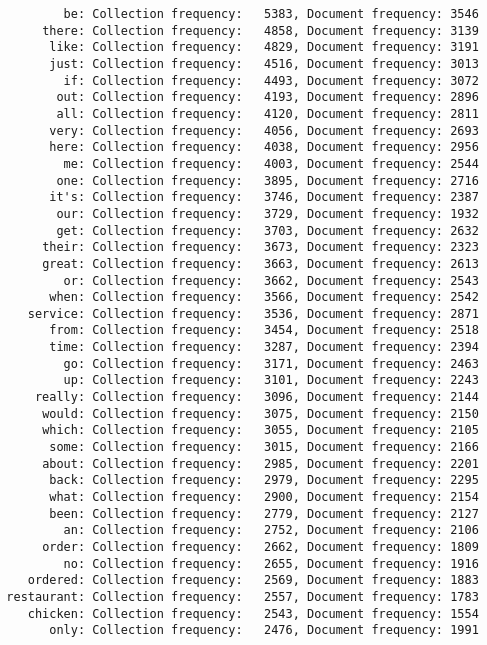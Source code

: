 \documentclass{article}
\begin{document}
\begin{verbatim}
          be: Collection frequency:   5383, Document frequency: 3546
       there: Collection frequency:   4858, Document frequency: 3139
        like: Collection frequency:   4829, Document frequency: 3191
        just: Collection frequency:   4516, Document frequency: 3013
          if: Collection frequency:   4493, Document frequency: 3072
         out: Collection frequency:   4193, Document frequency: 2896
         all: Collection frequency:   4120, Document frequency: 2811
        very: Collection frequency:   4056, Document frequency: 2693
        here: Collection frequency:   4038, Document frequency: 2956
          me: Collection frequency:   4003, Document frequency: 2544
         one: Collection frequency:   3895, Document frequency: 2716
        it's: Collection frequency:   3746, Document frequency: 2387
         our: Collection frequency:   3729, Document frequency: 1932
         get: Collection frequency:   3703, Document frequency: 2632
       their: Collection frequency:   3673, Document frequency: 2323
       great: Collection frequency:   3663, Document frequency: 2613
          or: Collection frequency:   3662, Document frequency: 2543
        when: Collection frequency:   3566, Document frequency: 2542
     service: Collection frequency:   3536, Document frequency: 2871
        from: Collection frequency:   3454, Document frequency: 2518
        time: Collection frequency:   3287, Document frequency: 2394
          go: Collection frequency:   3171, Document frequency: 2463
          up: Collection frequency:   3101, Document frequency: 2243
      really: Collection frequency:   3096, Document frequency: 2144
       would: Collection frequency:   3075, Document frequency: 2150
       which: Collection frequency:   3055, Document frequency: 2105
        some: Collection frequency:   3015, Document frequency: 2166
       about: Collection frequency:   2985, Document frequency: 2201
        back: Collection frequency:   2979, Document frequency: 2295
        what: Collection frequency:   2900, Document frequency: 2154
        been: Collection frequency:   2779, Document frequency: 2127
          an: Collection frequency:   2752, Document frequency: 2106
       order: Collection frequency:   2662, Document frequency: 1809
          no: Collection frequency:   2655, Document frequency: 1916
     ordered: Collection frequency:   2569, Document frequency: 1883
  restaurant: Collection frequency:   2557, Document frequency: 1783
     chicken: Collection frequency:   2543, Document frequency: 1554
        only: Collection frequency:   2476, Document frequency: 1991

\end{verbatim}
\end{document}
